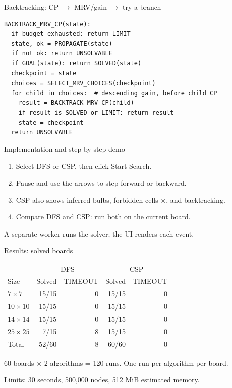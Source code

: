 \begin{frame}[fragile]{Backtracking: CP $\rightarrow$ MRV/gain $\rightarrow$ try a branch}
\begin{lstlisting}[breaklines=true]
BACKTRACK_MRV_CP(state):
  if budget exhausted: return LIMIT
  state, ok = PROPAGATE(state)
  if not ok: return UNSOLVABLE
  if GOAL(state): return SOLVED(state)
  checkpoint = state
  choices = SELECT_MRV_CHOICES(checkpoint)
  for child in choices:  # descending gain, before child CP
    result = BACKTRACK_MRV_CP(child)
    if result is SOLVED or LIMIT: return result
    state = checkpoint
  return UNSOLVABLE
\end{lstlisting}
\end{frame}

\begin{frame}{Implementation and step-by-step demo}
\begin{enumerate}
\item Select DFS or CSP, then click Start Search.
\item Pause and use the arrows to step forward or backward.
\item CSP also shows inferred bulbs, forbidden cells $\times$, and backtracking.
\item Compare DFS and CSP: run both on the current board.
\end{enumerate}
\vspace{3mm}\small
A separate worker runs the solver; the UI renders each event.
\end{frame}

\begin{frame}{Results: solved boards}
\centering\small\begin{tabular}{@{}lrrrr@{}}\toprule
 & \multicolumn{2}{c}{DFS} & \multicolumn{2}{c}{CSP}\\
Size & Solved & TIMEOUT & Solved & TIMEOUT\\\midrule
$7\times7$ & 15/15 & 0 & 15/15 & 0\\
$10\times10$ & 15/15 & 0 & 15/15 & 0\\
$14\times14$ & 15/15 & 0 & 15/15 & 0\\
$25\times25$ & 7/15 & 8 & 15/15 & 0\\\midrule
Total & 52/60 & 8 & 60/60 & 0\\\bottomrule
\end{tabular}\par\vspace{3mm}
\raggedright 60 boards $\times$ 2 algorithms = 120 runs. One run per algorithm per board.\par
Limits: 30 seconds, 500,000 nodes, 512 MiB estimated memory.
\end{frame}

